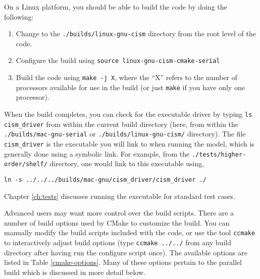 \begin{mdframed}[style=ubuntu] %
On a Linux platform, you should be able to build the code by doing the following:

\begin{enumerate}
\item{Change to the \texttt{./builds/linux-gnu-cism} directory from the root level of the code.}
\item{Configure the build using \texttt{source linux-gnu-cism-cmake-serial}}
\item{Build the code using \texttt{make -j X}, where the ``X'' refers to the number of processors available for use in the build (or just \texttt{make} if you have only one processor).}
\end{enumerate}
\end{mdframed}                 %

When the build completes, you can check for the executable driver by typing \texttt{ls cism\_driver} from within the current build directory (here, from within the \texttt{./builds/mac-gnu-serial} or \texttt{./builds/linux-gnu-cism/} directory). The file \texttt{cism\_driver} is the executable you will link to when running the model, which is generally done using a symbolic link. For example, from the \texttt{./tests/higher-order/shelf/} directory, one would link to this executable using, 

\begin{verbatim}
ln -s ../../../builds/mac-gnu/cism_driver/cism_driver ./
\end{verbatim}

Chapter \ref{ch:tests} discusses running the executable for standard test cases.

Advanced users may want more control over the build scripts.  There are a number of
build options used by CMake to customize the build.  You can manually modify the 
build scripts included with the code, or use the tool \texttt{ccmake} to 
interactively adjust build options (type \texttt{ccmake ../../} from any build directory
after having run the configure script once).  The available options are listed in Table \ref{cmake-options}.
Many of these options pertain to the parallel build which is discussed in more detail below.



